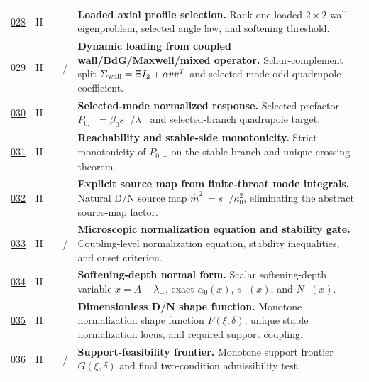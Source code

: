 {\begin{longtable}{@{}L{0.055\textwidth}L{0.075\textwidth}L{0.145\textwidth}L{0.235\textwidth}L{0.43\textwidth}@{}}
\addlinespace
\hyperref[stage:028]{028} & II &  & \StatusExactClosure{} & \textbf{Loaded axial profile selection.} Rank-one loaded \(2\times2\) wall eigenproblem, selected angle law, and softening threshold. \\
\addlinespace
\hyperref[stage:029]{029} & II &  & \StatusExactClosure{} / \StatusReduced{} & \textbf{Dynamic loading from coupled wall/BdG/Maxwell/mixed operator.} Schur-complement split \(\Sigma_{\rm wall}=\Xi I_2+\alpha vv^T\) and selected-mode odd quadrupole coefficient. \\
\addlinespace
\hyperref[stage:030]{030} & II &  & \StatusExactClosure{} & \textbf{Selected-mode normalized response.} Selected prefactor \(P_{0,-}=\beta_0s_-/\lambda_-\) and selected-branch quadrupole target. \\
\addlinespace
\hyperref[stage:031]{031} & II &  & \StatusExactClosure{} & \textbf{Reachability and stable-side monotonicity.} Strict monotonicity of \(P_{0,-}\) on the stable branch and unique crossing theorem. \\
\addlinespace
\hyperref[stage:032]{032} & II &  & \StatusExactClosure{} & \textbf{Explicit source map from finite-throat mode integrals.} Natural D/N source map \(\widehat m_-^2=s_-/\kappa_0^2\), eliminating the abstract source-map factor. \\
\addlinespace
\hyperref[stage:033]{033} & II &  & \StatusExactClosure{} / \StatusOpen{} & \textbf{Microscopic normalization equation and stability gate.} Coupling-level normalization equation, stability inequalities, and onset criterion. \\
\addlinespace
\hyperref[stage:034]{034} & II &  & \StatusExactClosure{} & \textbf{Softening-depth normal form.} Scalar softening-depth variable \(x=A-\lambda_-\), exact \(\alpha_0(x)\), \(s_-(x)\), and \(N_-(x)\). \\
\addlinespace
\hyperref[stage:035]{035} & II &  & \StatusExactClosure{} & \textbf{Dimensionless D/N shape function.} Monotone normalization shape function \(F(\xi,\delta)\), unique stable normalization locus, and required support coupling. \\
\addlinespace
\hyperref[stage:036]{036} & II &  & \StatusExactClosure{} / \StatusOpen{} & \textbf{Support-feasibility frontier.} Monotone support frontier \(G(\xi,\delta)\) and final two-condition admissibility test. \\

\end{longtable}}
